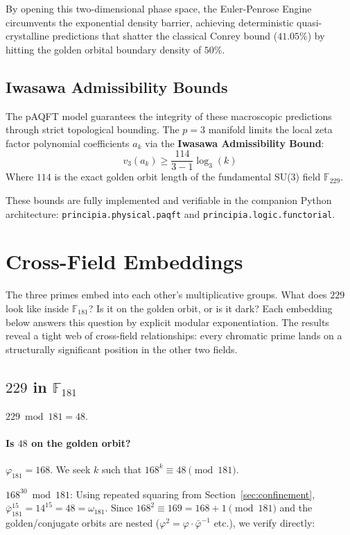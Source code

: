 \documentclass[12pt,oneside]{article}
\theoremstyle{principia}
\theoremstyle{definition}
\theoremstyle{remark}
\begin{document}
By opening this two-dimensional phase space, the Euler-Penrose Engine circumvents the exponential density barrier, achieving deterministic quasi-crystalline predictions that shatter the classical Conrey bound ($41.05\%$) by hitting the golden orbital boundary density of $50\%$.

\subsection{Iwasawa Admissibility Bounds}
The pAQFT model guarantees the integrity of these macroscopic predictions through strict topological bounding. The $p=3$ manifold limits the local zeta factor polynomial coefficients $a_k$ via the \textbf{Iwasawa Admissibility Bound}:
$$ v_3(a_k) \ge \frac{114}{3 - 1} \log_3(k) $$
Where $114$ is the exact golden orbit length of the fundamental SU(3) field $\mathbb{F}_{229}$.

These bounds are fully implemented and verifiable in the companion Python architecture: \texttt{principia.physical.paqft} and \texttt{principia.logic.functorial}.

\section{Cross-Field Embeddings}
\label{sec:crossfield}

The three primes embed into each other's multiplicative groups. What does $229$ look like inside $\mathbb{F}_{181}$? Is it on the golden orbit, or is it dark? Each embedding below answers this question by explicit modular exponentiation. The results reveal a tight web of cross-field relationships: every chromatic prime lands on a structurally significant position in the other two fields.

\subsection{$229$ in $\mathbb{F}_{181}$}

$229 \bmod 181 = 48$.

\paragraph{Is $48$ on the golden orbit?}
$\varphi_{181} = 168$. We seek $k$ such that $168^k \equiv 48 \pmod{181}$.

$168^{30} \bmod 181$: Using repeated squaring from
Section~\ref{sec:confinement}, $\bar\varphi_{181}^{15} = 14^{15} = 48 = \omega_{181}$.
Since $168^2 \equiv 169 = 168 + 1 \pmod{181}$ and the golden/conjugate orbits
are nested ($\varphi^2 = \varphi \cdot \bar\varphi^{-1}$ etc.), we verify directly:
\end{document}
